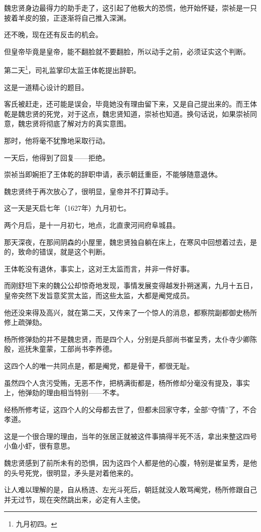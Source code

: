 \begin{multicols}{\theparacolNo}
魏忠贤身边最得力的助手走了，这引起了他极大的恐慌，他开始怀疑，崇祯是一只披着羊皮的狼，正逐渐将自己推入深渊。

还不晚，现在还有反击的机会。

但皇帝毕竟是皇帝，能不翻脸就不要翻脸，所以动手之前，必须证实这个判断。

第二天\footnote{九月初四。}，司礼监掌印太监王体乾提出辞职。

这是一道精心设计的题目。

客氏被赶走，还可能是误会，毕竟她没有理由留下来，又是自己提出来的。而王体乾是魏忠贤的死党，对于这点，魏忠贤知道，崇祯也知道。换句话说，如果崇祯同意，魏忠贤将彻底了解对方的真实意图。

那时，他将毫不犹豫地采取行动。

一天后，他得到了回复——拒绝。

崇祯当即婉拒了王体乾的辞职申请，表示朝廷重臣，不能够随意退休。

魏忠贤终于再次放心了，很明显，皇帝并不打算动手。

这一天是天启七年（1627年）九月初七。

两个月后，是十一月初七，地点，北直隶河间府阜城县。

那天深夜，在那间阴森的小屋里，魏忠贤独自躺在床上，在寒风中回想着过去，是的，致命的错误，就是这个判断。

王体乾没有退休，事实上，这对王太监而言，并非一件好事。

而刚舒坦下来的魏公公却惊奇地发现，事情发展变得越发扑朔迷离，九月十五日，皇帝突然下发旨意奖赏太监，而这些太监，大都是阉党成员。

他还没来得及高兴，就在第二天，又传来了一个惊人的消息，都察院副都御史杨所修上疏弹劾。

杨所修弹劾的并不是魏忠贤，而是四个人，分别是兵部尚书崔呈秀，太仆寺少卿陈殷，巡抚朱童蒙，工部尚书李养德。

这四个人的唯一共同点是，都是阉党，都是骨干，都很无耻。

虽然四个人贪污受贿，无恶不作，把柄满街都是，杨所修却分毫没有提及，事实上，他弹劾的理由相当特别——不孝。

经杨所修考证，这四个人的父母都去世了，但都未回家守孝，全部“夺情”了，不合孝道。

这是一个很合理的理由，当年的张居正就被这件事搞得半死不活，拿出来整这四号小鱼小虾，很有意思。

魏忠贤感到了前所未有的恐惧，因为这四个人都是他的心腹，特别是崔呈秀，是他的头号死党，很明显，矛头是对着他来的。

让人难以理解的是，自从杨涟、左光斗死后，朝廷就没人敢骂阉党，杨所修跟自己并无过节，现在突然跳出来，必定有人主使。


\end{multicols}
